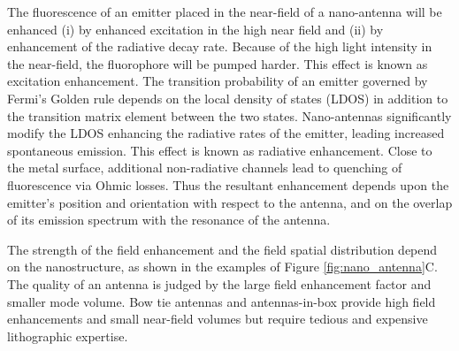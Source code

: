 The fluorescence of an emitter placed in the near-field of a nano-antenna will be enhanced (i) by enhanced excitation in the high near field and (ii) by enhancement of the radiative decay rate.
Because of the high light intensity in the near-field, the fluorophore will be pumped harder. This effect is known as excitation enhancement.
The transition probability of an emitter governed by Fermi's Golden rule depends on the local density of states (LDOS) in addition to the transition matrix element between the two states.
Nano-antennas significantly modify the LDOS enhancing the radiative rates of the emitter, leading increased spontaneous emission. This effect is known as radiative enhancement.
Close to the metal surface, additional non-radiative channels lead to quenching of fluorescence via Ohmic losses.
Thus the resultant enhancement depends upon the emitter's position and orientation with respect to the antenna, and on the overlap of its emission spectrum with the resonance of the antenna.\cite{anger2006enhancement,khatua2014resonant}

The strength of the field enhancement and the field spatial distribution depend on the nanostructure, as shown in the examples of Figure \ref{fig:nano_antenna}C.
The quality of an antenna is judged by the large field enhancement factor and smaller mode volume.
Bow tie antennas and antennas-in-box provide high field enhancements and small near-field volumes but require tedious and expensive lithographic expertise.\cite{novotny2011antennas,regmi2017thesis}

